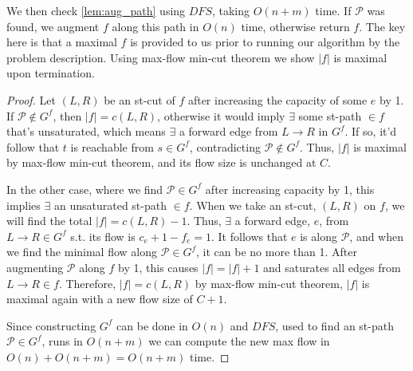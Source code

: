\documentclass{article}
\begin{document}
	We then check \ref{lem:aug_path} using $DFS$, taking $O(n+m)$ time. If $\mathcal{P}$ was found, we augment $f$ along this path in $O(n)$ time, otherwise return $f$. The key here is that a maximal $f$ is provided to us prior to running our algorithm by the problem description. Using max-flow min-cut theorem we show $|f|$ is maximal upon termination.

\begin{proof}
	Let $(L,R)$ be an st-cut of $f$ after increasing the capacity of some $e$ by 1. If $\mathcal{P} \notin G^f$, then $|f| = c(L,R)$, otherwise it would imply $\exists$ some st-path $\in f$ that's unsaturated, which means $\exists$ a forward edge from $L \to R$ in $G^f$. If so, it'd follow that $t$ is reachable from $s \in G^f$, contradicting  $\mathcal{P} \notin G^f$. Thus, $|f|$ is maximal by max-flow min-cut theorem, and its flow size is unchanged at $C$.
	
	In the other case, where we find $\mathcal{P} \in G^f$ after increasing capacity by 1, this implies $\exists$ an unsaturated st-path $\in f$. When we take an st-cut, $(L,R)$ on $f$, we will find the total $|f| = c(L,R) -1$. Thus, $\exists$ a forward edge, $e$, from $L \to R \in G^f$ s.t. its flow is $c_e +1- f_e = 1$. It follows that $e$ is along $\mathcal{P}$, and when we find the minimal flow along $\mathcal{P} \in G^f$, it can be no more than 1. After augmenting $\mathcal{P}$ along $f$ by 1, this causes $|f| = |f|+1$ and saturates all edges from $L \to R \in f$. Therefore, $|f| = c(L,R)$ by max-flow min-cut theorem, $|f|$ is maximal again with a new flow size of $C+1$.
	
	Since constructing $G^f$ can be done in $O(n)$ and $DFS$, used to find an st-path $\mathcal{P} \in G^f$, runs in $O(n+m)$ we can compute the new max flow in $O(n) + O(n+m) = O(n+m)$ time.
\end{proof}
 
\end{document}
